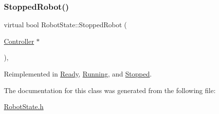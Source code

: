 \subsubsection{\texorpdfstring{StoppedRobot()}{StoppedRobot()}}
{\footnotesize\ttfamily virtual bool Robot\+State\+::\+Stopped\+Robot (\begin{DoxyParamCaption}\item[{\mbox{\hyperlink{class_controller}{Controller}} $\ast$}]{ }\end{DoxyParamCaption})\hspace{0.3cm}{\ttfamily [inline]}, {\ttfamily [virtual]}}



Reimplemented in \mbox{\hyperlink{class_ready_a88f3f1d4ef8b595ab9b9e421aa3a45c8}{Ready}}, \mbox{\hyperlink{class_running_aac21e16784554ee4ac95b9a76310ed42}{Running}}, and \mbox{\hyperlink{class_stopped_adbd9841ac4c2f267e07d683e389593a4}{Stopped}}.



The documentation for this class was generated from the following file\+:\begin{DoxyCompactItemize}
\item 
\mbox{\hyperlink{_robot_state_8h}{Robot\+State.\+h}}\end{DoxyCompactItemize}
